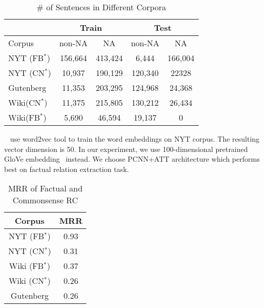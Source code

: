 \documentclass[11pt,a4paper]{article}
\begin{document}
\begin{table}[h]
	\small
	\centering
	\begin{tabular}{|l|c|c|c|c|}
		\hline
		& \multicolumn{2}{c|}{\textbf{Train}} & \multicolumn{2}{c|}{\textbf{Test}} \\\hline 
		Corpus                & \multicolumn{1}{c|}{non-NA} & \multicolumn{1}{c|}{NA} & \multicolumn{1}{c|}{non-NA} & \multicolumn{1}{c|}{NA} \\ \hline
		NYT (FB$^*$)  & 156,664                               & 413,424                           & 6,444‬                                & 166,004                           \\ \hline
		NYT (CN$^*$)& 10,937                                & 190,129‬                          & 120,340                                & 22328                             \\ \hline
		Gutenberg             & 11,353                                & 203,295                           & 124,968                               & 24,368                            \\ \hline
		Wiki(CN$^*$)             & 11,375                                 & 215,805                           & 130,212                                & 26,434                             \\ \hline
		Wiki(FB$^*$) & 5,690& 46,594 & 19,137 & 0 \\ \hline
	\end{tabular}
	\caption{\# of Sentences in Different Corpora}
	\label{table:sen distribution}
\end{table}



	
~\citet{lin2016neural} use word2vec tool to train the word embeddings on NYT corpus. The resulting vector dimension is 50. In our experiment, we use 100-dimensional pretrained GloVe embedding~\cite{pennington2014glove} instead. We choose PCNN+ATT architecture which performs best 
on factual relation extraction task.



\begin{table}[h]
	\small
	\centering
	\begin{tabular}{|c|c|}
		\hline
		\textbf{Corpus}            & \textbf{MRR}   \\ \hline
		NYT (FB$^*$)     & 0.93 \\ \hline
		NYT (CN$^*$) & 0.31 \\ \hline
		Wiki (FB$^*$)& 0.37 \\ \hline
		Wiki (CN$^*$)& 0.26 \\ \hline
		Gutenberg         & 0.26 \\ \hline
	\end{tabular}
	\caption{MRR of Factual and Commonsense RC}
	\label{table:results}
\end{table}
\end{document}
